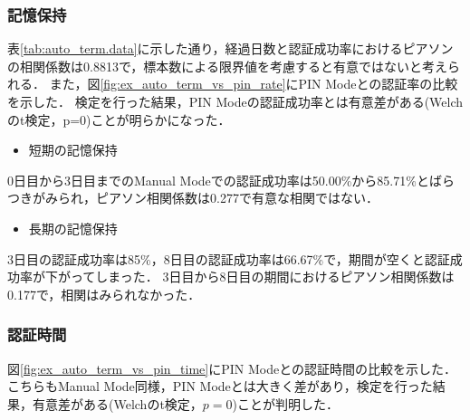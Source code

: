 \subsubsection{記憶保持}
表\ref{tab:auto_term.data}に示した通り，経過日数と認証成功率におけるピアソンの相関係数は0.8813で，標本数による限界値を考慮すると有意ではないと考えられる．
また，図\ref{fig:ex_auto_term_vs_pin_rate}にPIN Modeとの認証率の比較を示した．
検定を行った結果，PIN Modeの認証成功率とは有意差がある(Welchのt検定，p=0)ことが明らかになった．
\begin{itemize}
  \item 短期の記憶保持
\end{itemize}
0日目から3日目までのManual Modeでの認証成功率は50.00\%から85.71\%とばらつきがみられ，ピアソン相関係数は0.277で有意な相関ではない．

\begin{itemize}
  \item 長期の記憶保持
\end{itemize}
3日目の認証成功率は85\%，8日目の認証成功率は66.67\%で，期間が空くと認証成功率が下がってしまった．
3日目から8日目の期間におけるピアソン相関係数は0.177で，相関はみられなかった．

\subsubsection{認証時間}
図\ref{fig:ex_auto_term_vs_pin_time}にPIN Modeとの認証時間の比較を示した．
こちらもManual Mode同様，PIN Modeとは大きく差があり，検定を行った結果，有意差がある(Welchのt検定，$ p = 0 $)ことが判明した．

